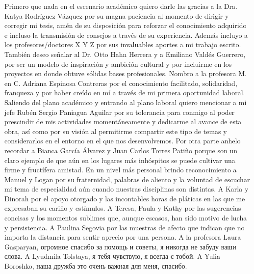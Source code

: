 \documentclass[class=report, crop=false]{standalone}
\begin{document}
\vspace{-1.4cm}
Primero que nada en el escenario académico quiero darle 
las gracias a la Dra. Katya Rodríguez Vázquez por su magna 
paciencia al momento de dirigir y corregir mi tesis, amén 
de su disposición para reforzar el conocimiento adquirido 
e incluso la transmisión de consejos a través de su experiencia.\break
Además incluyo a los profesores/doctores X Y Z por sus 
invaluables aportes a mi trabajo escrito.\break
También deseo señalar al Dr. Otto Hahn Herrera y a Emiliano 
Valdés Guerrero, por ser un modelo de inspiración y ambición 
cultural y por incluirme en los proyectos en donde obtuve 
sólidas bases profesionales.\break
Nombro a la profesora M. en C. Adriana Espinosa Contreras 
por el conocimiento facilitado, solidaridad, franqueza y 
por haber creído en mí a través de mi primera oportunidad 
laboral.\medskip\break
Saliendo del plano académico y entrando al plano laboral 
quiero mencionar a mi jefe Rubén Sergio Paniagua Aguilar 
por su tolerancia para conmigo al poder prescindir de mis 
actividades momentáneamente y dedicarme al avance de esta 
obra, así como por su visión al permitirme compartir este 
tipo de temas y considerarlos en el entorno en el que nos 
desenvolvemos.\break
Por otra parte anhelo recordar a Bianca García Álvarez y 
Juan Carlos Torres Patiño porque son un claro ejemplo de 
que aún en los lugares más inhóspitos se puede cultivar una 
firme y fructífera amistad.\medskip\break
En un nivel más personal brindo reconocimiento a Manuel y 
Logan por su fraternidad, palabras de aliento y la voluntad 
de escuchar mi tema de especialidad aún cuando nuestras 
disciplinas son distintas.\break
A Karla y Dinorah por el apoyo otorgado y las incontables 
horas de pláticas en las que me expresaban su cariño y 
estímulos.\break
A Teresa, Paula y Kathy por las sugerencias concisas y los 
momentos sublimes que, aunque escasos, han sido motivo de 
lucha y persistencia.\break
A Paulina Segovia por las muestras de afecto que indican 
que no importa la distancia para sentir aprecio por una 
persona.\break
A la profesora Laura Gasparyan, огромное 
спасибо за помощь и советы, я никогда не забуду ваши слова.\break
A Lyudmila Tolstaya, я тебя чувствую, 
я всегда с тобой.\break
A Yulia Boroshko, наша дружба это 
очень важная для меня, спасибо.

\end{document}
